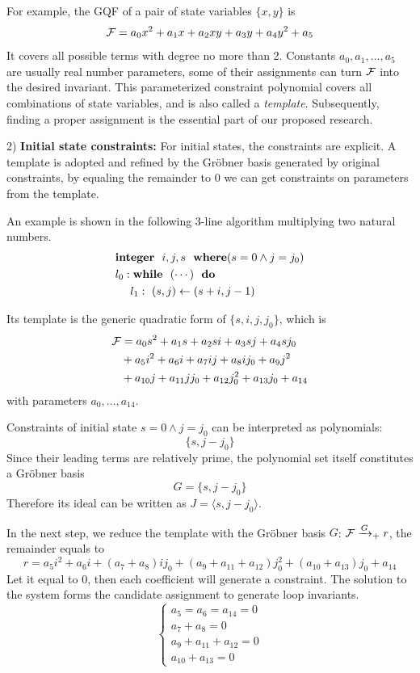 For example, the GQF of a pair of state variables $\{x,y\}$ is
$${\mathcal{F}} = a_0x^2+a_1x+a_2xy+a_3y+a_4y^2+a_5$$
It covers all possible terms with degree no more than 2. Constants $a_0,a_1,\dots, a_5$ are 
usually real number parameters,
some of their assignments can turn ${\mathcal{F}}$ into the desired invariant. This parameterized constraint
polynomial covers all combinations of state variables, and is also called a \emph{template}.
Subsequently, finding a proper assignment is the essential part of our proposed research.

2) {\bf Initial state constraints:} For initial states, the constraints are explicit. 
A template is adopted and refined by the Gr\"obner basis 
generated by original constraints, by equaling the remainder to 0 we can get constraints on
parameters from the template.

An example is shown in the following 3-line algorithm multiplying two natural numbers. 
\begin{align}
\label{eqn:loopinv}
& {\bf integer}~~i,j,s~~{\bf where}(s=0 \land j=j_0) \nonumber\\
& l_0: {\bf while}~~(\cdots)~~{\bf do} \nonumber\\
& ~~~~ l_1:~(s,j)\gets(s+i,j-1) 
\end{align}

Its template is the generic quadratic form of $\{s,i,j,j_0\}$, which is
\begin{align}
{\mathcal{F}} &= a_0s^2+a_1s+a_2si+a_3sj+a_4sj_0\nonumber\\
&+a_5i^2+a_6i+a_7ij+a_8ij_0+a_9j^2\nonumber\\
&+a_{10}j+a_{11}jj_0+a_{12}j_0^2+a_{13}j_0+a_{14}\nonumber
\end{align}
with parameters $a_0,\dots,a_{14}$.

Constraints of initial state $s=0\land j=j_0$ can be interpreted as polynomials:
$$\{s, j-j_0\}$$
Since their leading terms are relatively prime, the polynomial set itself constitutes a Gr\"obner basis 
$$G=\{s, j-j_0\}$$ 
Therefore its ideal can be written as
$J=\langle s,j-j_0\rangle$.

In the next step, we reduce the template with the Gr\"obner basis $G$: ${\mathcal{F}} \xrightarrow{G}_+ r$, the remainder equals to
$$r = a_5i^2+a_6i+(a_7+a_8)ij_0+(a_9+a_{11}+a_{12})j_0^2+(a_{10}+a_{13})j_0+a_{14}$$
Let it equal to 0, then each coefficient will generate a constraint. The solution to the system forms the candidate
assignment to generate loop invariants.
\begin{equation}
\label{eqn:parasys}
\left\{
\begin{array}{l}
a_5=a_6=a_{14}=0\\
a_7+a_8=0\\
a_9+a_{11}+a_{12}=0\\
a_{10}+a_{13}=0
\end{array}\right.
\end{equation}

